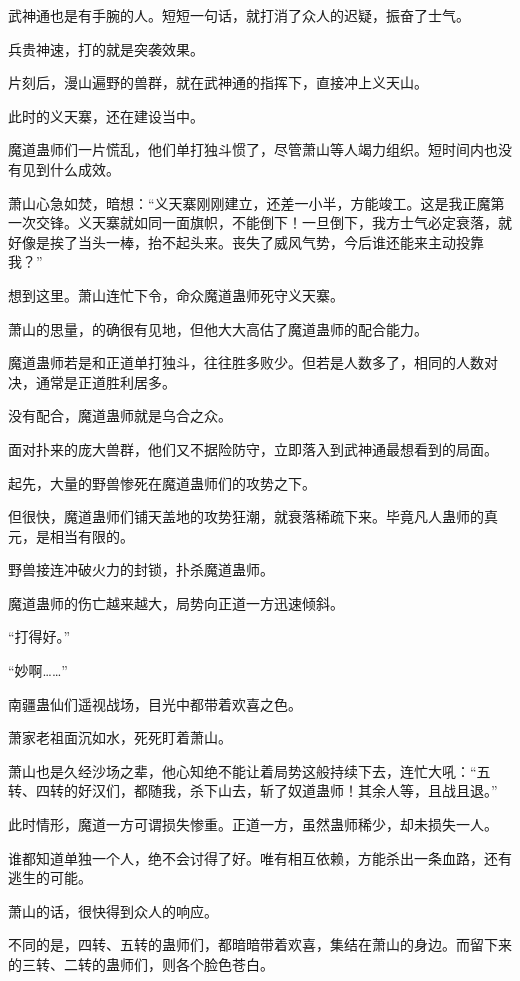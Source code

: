 \begin{this_body}
武神通也是有手腕的人。短短一句话，就打消了众人的迟疑，振奋了士气。

兵贵神速，打的就是突袭效果。

片刻后，漫山遍野的兽群，就在武神通的指挥下，直接冲上义天山。

此时的义天寨，还在建设当中。

魔道蛊师们一片慌乱，他们单打独斗惯了，尽管萧山等人竭力组织。短时间内也没有见到什么成效。

萧山心急如焚，暗想：“义天寨刚刚建立，还差一小半，方能竣工。这是我正魔第一次交锋。义天寨就如同一面旗帜，不能倒下！一旦倒下，我方士气必定衰落，就好像是挨了当头一棒，抬不起头来。丧失了威风气势，今后谁还能来主动投靠我？”

想到这里。萧山连忙下令，命众魔道蛊师死守义天寨。

萧山的思量，的确很有见地，但他大大高估了魔道蛊师的配合能力。

魔道蛊师若是和正道单打独斗，往往胜多败少。但若是人数多了，相同的人数对决，通常是正道胜利居多。

没有配合，魔道蛊师就是乌合之众。

面对扑来的庞大兽群，他们又不据险防守，立即落入到武神通最想看到的局面。

起先，大量的野兽惨死在魔道蛊师们的攻势之下。

但很快，魔道蛊师们铺天盖地的攻势狂潮，就衰落稀疏下来。毕竟凡人蛊师的真元，是相当有限的。

野兽接连冲破火力的封锁，扑杀魔道蛊师。

魔道蛊师的伤亡越来越大，局势向正道一方迅速倾斜。

“打得好。”

“妙啊……”

南疆蛊仙们遥视战场，目光中都带着欢喜之色。

萧家老祖面沉如水，死死盯着萧山。

萧山也是久经沙场之辈，他心知绝不能让着局势这般持续下去，连忙大吼：“五转、四转的好汉们，都随我，杀下山去，斩了奴道蛊师！其余人等，且战且退。”

此时情形，魔道一方可谓损失惨重。正道一方，虽然蛊师稀少，却未损失一人。

谁都知道单独一个人，绝不会讨得了好。唯有相互依赖，方能杀出一条血路，还有逃生的可能。

萧山的话，很快得到众人的响应。

不同的是，四转、五转的蛊师们，都暗暗带着欢喜，集结在萧山的身边。而留下来的三转、二转的蛊师们，则各个脸色苍白。


\end{this_body}
